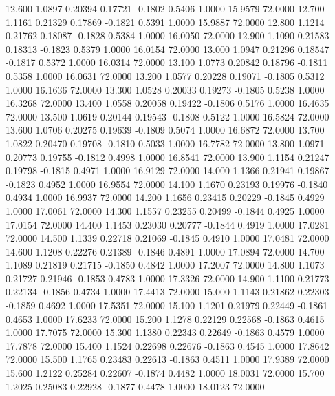   12.600   1.0897   0.20394   0.17721  -0.1802   0.5406   1.0000  15.9579  72.0000
  12.700   1.1161   0.21329   0.17869  -0.1821   0.5391   1.0000  15.9887  72.0000
  12.800   1.1214   0.21762   0.18087  -0.1828   0.5384   1.0000  16.0050  72.0000
  12.900   1.1090   0.21583   0.18313  -0.1823   0.5379   1.0000  16.0154  72.0000
  13.000   1.0947   0.21296   0.18547  -0.1817   0.5372   1.0000  16.0314  72.0000
  13.100   1.0773   0.20842   0.18796  -0.1811   0.5358   1.0000  16.0631  72.0000
  13.200   1.0577   0.20228   0.19071  -0.1805   0.5312   1.0000  16.1636  72.0000
  13.300   1.0528   0.20033   0.19273  -0.1805   0.5238   1.0000  16.3268  72.0000
  13.400   1.0558   0.20058   0.19422  -0.1806   0.5176   1.0000  16.4635  72.0000
  13.500   1.0619   0.20144   0.19543  -0.1808   0.5122   1.0000  16.5824  72.0000
  13.600   1.0706   0.20275   0.19639  -0.1809   0.5074   1.0000  16.6872  72.0000
  13.700   1.0822   0.20470   0.19708  -0.1810   0.5033   1.0000  16.7782  72.0000
  13.800   1.0971   0.20773   0.19755  -0.1812   0.4998   1.0000  16.8541  72.0000
  13.900   1.1154   0.21247   0.19798  -0.1815   0.4971   1.0000  16.9129  72.0000
  14.000   1.1366   0.21941   0.19867  -0.1823   0.4952   1.0000  16.9554  72.0000
  14.100   1.1670   0.23193   0.19976  -0.1840   0.4934   1.0000  16.9937  72.0000
  14.200   1.1656   0.23415   0.20229  -0.1845   0.4929   1.0000  17.0061  72.0000
  14.300   1.1557   0.23255   0.20499  -0.1844   0.4925   1.0000  17.0154  72.0000
  14.400   1.1453   0.23030   0.20777  -0.1844   0.4919   1.0000  17.0281  72.0000
  14.500   1.1339   0.22718   0.21069  -0.1845   0.4910   1.0000  17.0481  72.0000
  14.600   1.1208   0.22276   0.21389  -0.1846   0.4891   1.0000  17.0894  72.0000
  14.700   1.1089   0.21819   0.21715  -0.1850   0.4842   1.0000  17.2007  72.0000
  14.800   1.1073   0.21727   0.21946  -0.1853   0.4783   1.0000  17.3326  72.0000
  14.900   1.1100   0.21773   0.22134  -0.1856   0.4734   1.0000  17.4413  72.0000
  15.000   1.1143   0.21862   0.22303  -0.1859   0.4692   1.0000  17.5351  72.0000
  15.100   1.1201   0.21979   0.22449  -0.1861   0.4653   1.0000  17.6233  72.0000
  15.200   1.1278   0.22129   0.22568  -0.1863   0.4615   1.0000  17.7075  72.0000
  15.300   1.1380   0.22343   0.22649  -0.1863   0.4579   1.0000  17.7878  72.0000
  15.400   1.1524   0.22698   0.22676  -0.1863   0.4545   1.0000  17.8642  72.0000
  15.500   1.1765   0.23483   0.22613  -0.1863   0.4511   1.0000  17.9389  72.0000
  15.600   1.2122   0.25284   0.22607  -0.1874   0.4482   1.0000  18.0031  72.0000
  15.700   1.2025   0.25083   0.22928  -0.1877   0.4478   1.0000  18.0123  72.0000
